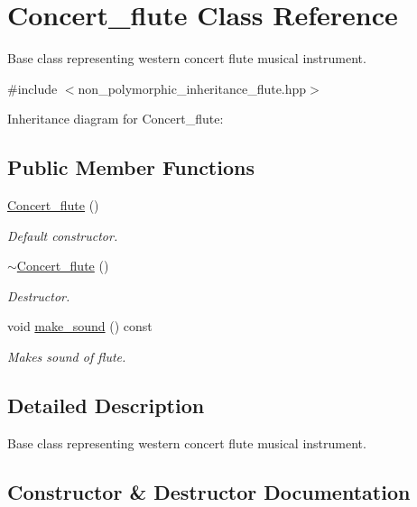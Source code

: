 \hypertarget{classConcert__flute}{}\section{Concert\+\_\+flute Class Reference}
\label{classConcert__flute}


Base class representing western concert flute musical instrument.  




{\ttfamily \#include $<$non\+\_\+polymorphic\+\_\+inheritance\+\_\+flute.\+hpp$>$}



Inheritance diagram for Concert\+\_\+flute\+:
\subsection*{Public Member Functions}
\begin{DoxyCompactItemize}
\item 
\hyperlink{classConcert__flute_a2bd6884b9284fda41bf6b08eb71e5488}{Concert\+\_\+flute} ()
\begin{DoxyCompactList}\small\item\em Default constructor. \end{DoxyCompactList}\item 
\hyperlink{classConcert__flute_a2172726dd7d670df08132e3adf274128}{$\sim$\+Concert\+\_\+flute} ()
\begin{DoxyCompactList}\small\item\em Destructor. \end{DoxyCompactList}\item 
void \hyperlink{classConcert__flute_aa9e28ac9e42a2a45c00e3af1dcb796bc}{make\+\_\+sound} () const 
\begin{DoxyCompactList}\small\item\em Makes sound of flute. \end{DoxyCompactList}\end{DoxyCompactItemize}


\subsection{Detailed Description}
Base class representing western concert flute musical instrument. 

\subsection{Constructor \& Destructor Documentation}
